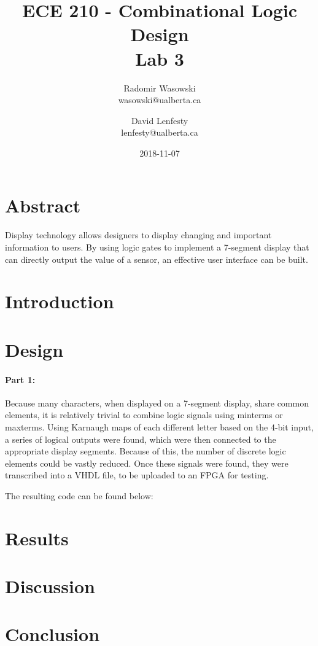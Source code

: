 \documentclass{article}
\title{ECE 210 - Combinational Logic Design \\ Lab 3}
\date{2018-11-07}
\author{Radomir Wasowski \\ wasowski@ualberta.ca
        \and David Lenfesty \\ lenfesty@ualberta.ca}
\begin{document}
\doublespacing
\maketitle
\newpage

\singlespacing

\section{Abstract}

Display technology allows designers to display changing and important information to users.
By using logic gates to implement a 7-segment display that can directly output the value of a sensor,
an effective user interface can be built.

\section{Introduction}



\section{Design}

\paragraph{Part 1:}

Because many characters, when displayed on a 7-segment display, share common elements,
it is relatively trivial to combine logic signals using minterms or maxterms.
Using Karnaugh maps of each different letter based on the 4-bit input, a series of logical outputs
were found, which were then connected to the appropriate display segments.
Because of this, the number of discrete logic elements could be vastly reduced.
Once these signals were found, they were transcribed into a VHDL file,
to be uploaded to an FPGA for testing.

The resulting code can be found below:


\section{Results}


\section{Discussion}


\section{Conclusion}
\end{document}
